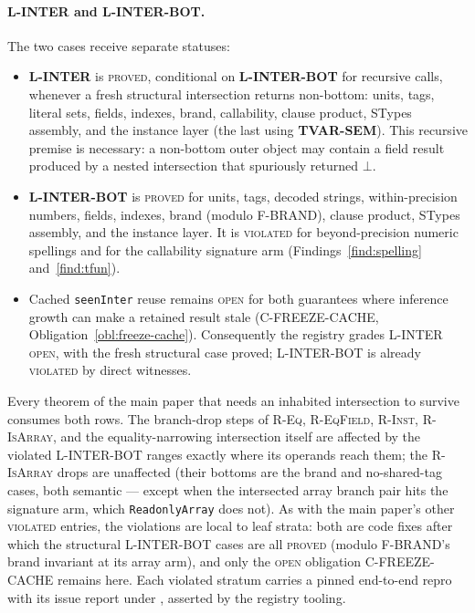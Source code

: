 \documentclass[11pt]{article}
\begin{document}
\paragraph{L-INTER and L-INTER-BOT.} The two cases receive separate statuses:
\begin{itemize}
\item \textbf{L-INTER} is \textsc{proved}, conditional on
  \textbf{L-INTER-BOT} for recursive calls, whenever a fresh structural
  intersection returns non-bottom: units, tags, literal sets, fields,
  indexes, brand, callability, clause product, STypes assembly, and the
  instance layer (the last using \textbf{TVAR-SEM}). This recursive premise
  is necessary: a non-bottom outer object may contain a field result
  produced by a nested intersection that spuriously returned $\bot$.
\item \textbf{L-INTER-BOT} is \textsc{proved} for units, tags, decoded
  strings, within-precision numbers, fields, indexes, brand (modulo
  F-BRAND), clause product, STypes assembly, and the instance layer. It is
  \textsc{violated} for beyond-precision numeric spellings and for the
  callability signature arm (Findings~\ref{find:spelling}
  and~\ref{find:tfun}).
\item Cached \texttt{seenInter} reuse remains \textsc{open} for both
  guarantees where inference growth can make a retained result stale
  (C-FREEZE-CACHE, Obligation~\ref{obl:freeze-cache}). Consequently the
  registry grades L-INTER \textsc{open}, with the fresh structural case
  proved; L-INTER-BOT is already \textsc{violated} by direct witnesses.
\end{itemize}
Every theorem of the main paper that needs an inhabited intersection to
survive consumes both rows. The
branch-drop steps of \textsc{R-Eq}, \textsc{R-EqField},
\textsc{R-Inst}, \textsc{R-IsArray}, and the equality-narrowing
intersection itself are affected by the violated L-INTER-BOT ranges
exactly where its operands reach them; the \textsc{R-IsArray} drops
are unaffected (their bottoms are the brand and no-shared-tag cases,
both semantic — except when the intersected array branch pair hits the
signature arm, which \texttt{ReadonlyArray} does not). As with the
main paper's other \textsc{violated} entries, the violations are local
to leaf strata: both are code fixes after which the structural
L-INTER-BOT cases are all \textsc{proved} (modulo F-BRAND's brand
invariant at its array arm), and only the \textsc{open} obligation
C-FREEZE-CACHE remains here. Each violated
stratum carries a pinned end-to-end repro with its issue report under
, asserted by the registry tooling.
\end{document}
